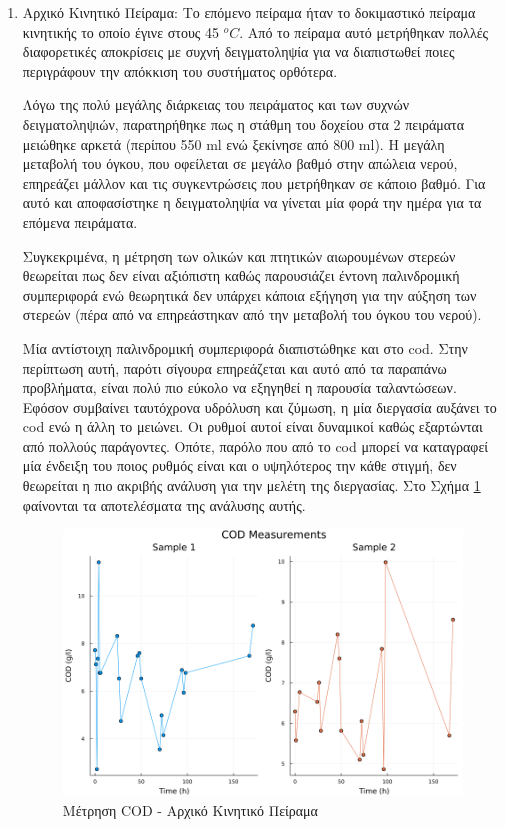 \documentclass[11pt]{report}
\begin{document}
\begin{enumerate}
\item Αρχικό Κινητικό Πείραμα:
\label{sec:org7bc1fe4}
Το επόμενο πείραμα ήταν το δοκιμαστικό πείραμα κινητικής το οποίο έγινε στους 45 \(^oC\). Από το πείραμα αυτό μετρήθηκαν πολλές διαφορετικές αποκρίσεις με συχνή δειγματοληψία για να διαπιστωθεί ποιες περιγράφουν την απόκκιση του συστήματος ορθότερα.

Λόγω της πολύ μεγάλης διάρκειας του πειράματος και των συχνών δειγματοληψιών, παρατηρήθηκε πως η στάθμη του δοχείου στα 2 πειράματα μειώθηκε αρκετά (περίπου 550 ml ενώ ξεκίνησε από 800 ml). Η μεγάλη μεταβολή του όγκου, που οφείλεται σε μεγάλο βαθμό στην απώλεια νερού, επηρεάζει μάλλον και τις συγκεντρώσεις που μετρήθηκαν σε κάποιο βαθμό. Για αυτό και αποφασίστηκε η δειγματοληψία να γίνεται μία φορά την ημέρα για τα επόμενα πειράματα.

Συγκεκριμένα, η μέτρηση των ολικών και πτητικών αιωρουμένων στερεών θεωρείται πως δεν είναι αξιόπιστη καθώς παρουσιάζει έντονη παλινδρομική συμπεριφορά ενώ θεωρητικά δεν υπάρχει κάποια εξήγηση για την αύξηση των στερεών (πέρα από να επηρεάστηκαν από την μεταβολή του όγκου του νερού).

Μία αντίστοιχη παλινδρομική συμπεριφορά διαπιστώθηκε και στο \acrshort{cod}. Στην περίπτωση αυτή, παρότι σίγουρα επηρεάζεται και αυτό από τα παραπάνω προβλήματα, είναι πολύ πιο εύκολο να εξηγηθεί η παρουσία ταλαντώσεων. Εφόσον συμβαίνει ταυτόχρονα υδρόλυση και ζύμωση, η μία διεργασία αυξάνει το \acrshort{cod} ενώ η άλλη το μειώνει. Οι ρυθμοί αυτοί είναι δυναμικοί καθώς εξαρτώνται από πολλούς παράγοντες. Οπότε, παρόλο που από το \acrshort{cod} μπορεί να καταγραφεί μία ένδειξη του ποιος ρυθμός είναι και ο υψηλότερος την κάθε στιγμή, δεν θεωρείται η πιο ακριβής ανάλυση για την μελέτη της διεργασίας. Στο Σχήμα \ref{fig:orgf1b4868} φαίνονται τα αποτελέσματα της ανάλυσης αυτής.

\begin{figure}[htbp]
\centering
\includegraphics[width=.9\linewidth]{../plots/23_10/cod_scatter_23_10.png}
\caption{\label{fig:orgf1b4868}Μέτρηση COD - Αρχικό Κινητικό Πείραμα}
\end{figure}


\end{enumerate}
\end{document}
